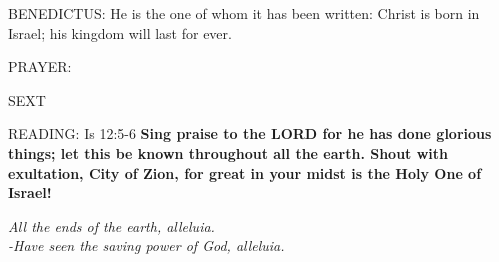 \noindent\small{\uppercase{BENEDICTUS:}}	He is the one of whom it has been written: Christ is born in Israel; his kingdom will last for ever.

\noindent\small{\uppercase{PRAYER:}}	

\begin{flushleft}\normalsize{\uppercase{SEXT\\}}\end{flushleft}
\noindent\small{\uppercase{READING:}}    Is 12:5-6 \textbf{   Sing praise to the LORD for he has done glorious things; let this be known throughout all the earth. Shout with exultation, City of Zion, for great in your midst is the Holy One of Israel!}
\begin{center}\textit{All the ends of the earth, alleluia.\\
-Have seen the saving power of God, alleluia.}\end{center}

